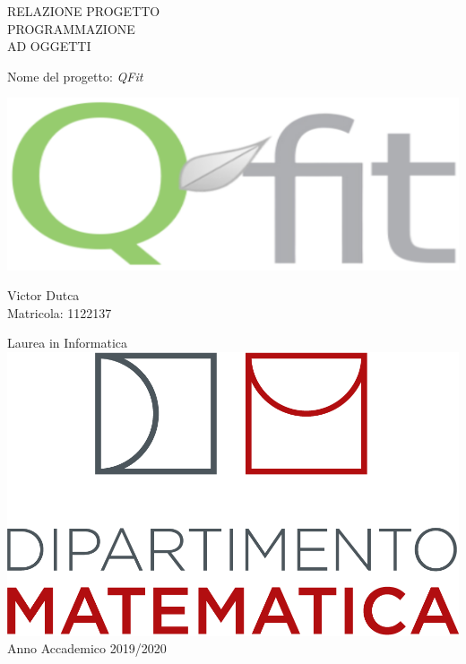 \documentclass[12pt, a4paper]{article}
\newcommand{\bigsize}{\fontsize{35pt}{20pt}\selectfont}
\newcommand{\mediumsize}{\fontsize{30pt}{20pt}\selectfont}
\newcommand{\normsize}{\fontsize{15pt}{10pt}\selectfont}
\begin{document}
\begin{titlepage}
\centering
		{\bigsize RELAZIONE PROGETTO\\}
		\vspace*{10px}
		{\bigsize PROGRAMMAZIONE\\}
		\vspace*{10px}
		{\bigsize AD OGGETTI\\}
		\vspace*{25px}
		
		{\bigsize Nome del progetto: \emph{QFit} \\}
		\vspace*{10px}
		


\includegraphics[scale=0.40]{img/logoProg.png}

		\vspace{20px}
		{\mediumsize Victor Dutca\\}
		\vspace*{5px}
		{\normsize Matricola: 1122137}
		\vspace*{30px}

		{\mediumsize  Laurea in Informatica\\ }
		\vspace*{30px}
		\centering
		\includegraphics[scale=0.15]{img/logoMath.png}\\		
		\vspace*{\fill}
		{\normsize Anno Accademico 2019/2020\\ }
\end{titlepage}
\tableofcontents
\newpage
\end{document}
